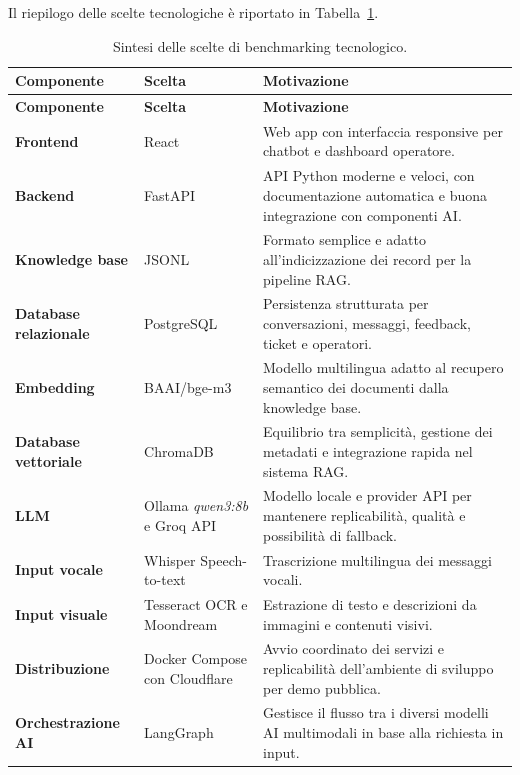 Il riepilogo delle scelte tecnologiche è riportato in Tabella~\ref{tab:benchmarking-tecnologico}.

{
\small
\begin{longtable}{p{} p{} p{}}
\caption{Sintesi delle scelte di benchmarking tecnologico.}
\label{tab:benchmarking-tecnologico}\tabularnewline
\toprule
\textbf{Componente} & \textbf{Scelta} & \textbf{Motivazione}\tabularnewline
\midrule
\endfirsthead

\toprule
\textbf{Componente} & \textbf{Scelta} & \textbf{Motivazione}\tabularnewline
\midrule
\endhead

\textbf{Frontend} & React & Web app con interfaccia responsive per chatbot e dashboard operatore.\tabularnewline
\textbf{Backend} & FastAPI & API Python moderne e veloci, con documentazione automatica e buona integrazione con componenti AI.\tabularnewline
\textbf{Knowledge base} & JSONL & Formato semplice e adatto all’indicizzazione dei record per la pipeline RAG.\tabularnewline
\textbf{Database relazionale} & PostgreSQL & Persistenza strutturata per conversazioni, messaggi, feedback, ticket e operatori.\tabularnewline
\textbf{Embedding} & BAAI/bge-m3 & Modello multilingua adatto al recupero semantico dei documenti dalla knowledge base.\tabularnewline
\textbf{Database vettoriale} & ChromaDB & Equilibrio tra semplicità, gestione dei metadati e integrazione rapida nel sistema RAG.\tabularnewline
\textbf{LLM} & Ollama \textit{qwen3:8b} e Groq API & Modello locale e provider API per mantenere replicabilità, qualità e possibilità di fallback.\tabularnewline
\textbf{Input vocale} & Whisper Speech-to-text & Trascrizione multilingua dei messaggi vocali.\tabularnewline
\textbf{Input visuale} & Tesseract OCR e Moondream & Estrazione di testo e descrizioni da immagini e contenuti visivi.\tabularnewline
\textbf{Distribuzione} & Docker Compose con Cloudflare & Avvio coordinato dei servizi e replicabilità dell’ambiente di sviluppo per demo pubblica.\tabularnewline
\textbf{Orchestrazione AI} & LangGraph & Gestisce il flusso tra i diversi modelli AI multimodali in base alla richiesta in input.\tabularnewline
\bottomrule
\end{longtable}
}